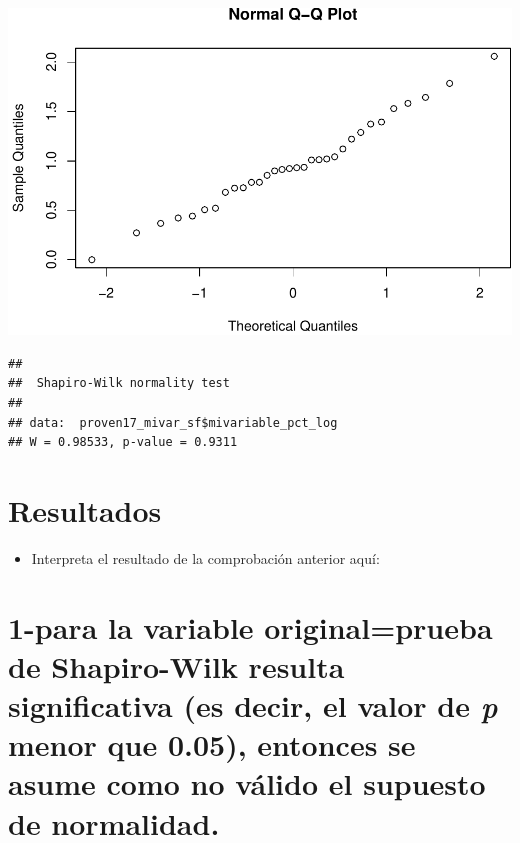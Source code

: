 \documentclass[11pt,]{article}
\newenvironment{Shaded}{\begin{snugshade}}{\end{snugshade}}
\newcommand{\KeywordTok}[1]{\textcolor[rgb]{0.13,0.29,0.53}{\textbf{#1}}}
\newcommand{\CommentTok}[1]{\textcolor[rgb]{0.56,0.35,0.01}{\textit{#1}}}
\newcommand{\OperatorTok}[1]{\textcolor[rgb]{0.81,0.36,0.00}{\textbf{#1}}}
\newcommand{\NormalTok}[1]{#1}
\providecommand{\tightlist}{%
\setlength{\itemsep}{0pt}\setlength{\parskip}{0pt}}
\begin{document}
\begin{Shaded}
\end{Shaded}

\includegraphics{proyecto_files/figure-latex/unnamed-chunk-21-2.pdf}

\begin{Shaded}
\end{Shaded}

\begin{verbatim}
## 
##  Shapiro-Wilk normality test
## 
## data:  proven17_mivar_sf$mivariable_pct_log
## W = 0.98533, p-value = 0.9311
\end{verbatim}

\section{Resultados}\label{resultados}

\begin{itemize}
\tightlist
\item
  Interpreta el resultado de la comprobación anterior aquí:
\end{itemize}

\section{\texorpdfstring{1-para la variable original=prueba de
Shapiro-Wilk resulta significativa (es decir, el valor de \emph{p} menor
que 0.05), entonces se asume como no válido el supuesto de
normalidad.}{1-para la variable original=prueba de Shapiro-Wilk resulta significativa (es decir, el valor de p menor que 0.05), entonces se asume como no válido el supuesto de normalidad.}}\label{para-la-variable-originalprueba-de-shapiro-wilk-resulta-significativa-es-decir-el-valor-de-p-menor-que-0.05-entonces-se-asume-como-no-vuxe1lido-el-supuesto-de-normalidad.}
\end{document}
